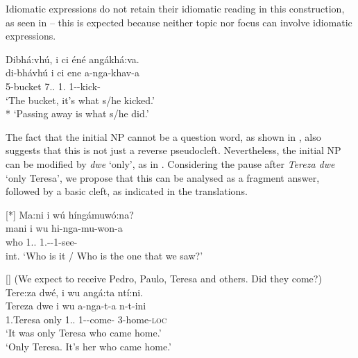 \documentclass[output=paper]{langscibook}
\begin{document}

\z

Idiomatic expressions do not retain their idiomatic reading in this construction, as seen in  – this is expected because neither topic nor focus can involve idiomatic expressions.\largerpage

\ea
\label{bkm:Ref127264997}
Dibhá:vhú, i ci éné angákhá:va.\\
\gll
di-bhávhú  i  ci  ene  a-nga-khav-a\\
5-bucket  \COP{}  7.\DEM.\PROX{}  1.\PRO{}  1\SM-\REL{}-kick-\FV{}\\
\glt
‘The bucket, it’s what s/he kicked.’\\
* `Passing away is what s/he did.’

\z

The fact that the initial NP cannot be a question word, as shown in , also suggests that this is not just a reverse pseudocleft. Nevertheless, the initial NP can be modified by \textit{dwe} ‘only’, as in . Considering the pause after \textit{Tereza dwe} ‘only Teresa’, we propose that this can be analysed as a fragment answer, followed by a basic cleft, as indicated in the translations.

\ea
[*]{
\label{bkm:Ref120698646}
Ma:ni i wú híngámuwó:na?\\
\gll
mani  i  wu  hi-nga-mu-won-a\\
who  \COP{}  1.\DEM.\PROX{}  1\SM.\PL{}-\REL{}-1\OM{}-see-\FV{}\\
\glt
int. ‘Who is it / Who is the one that we saw?’\\
}

\ex
[]{
\label{bkm:Ref120698660}
(We expect to receive Pedro, Paulo, Teresa and others. Did they come?)\\
Tere:za dwé, i wu angá:ta ntí:ni.\\
\gll
Tereza  dwe  i  wu  a-nga-t-a  n-t-ini\\
1.Teresa  only  \COP{}  1.\DEM.\PROX{}  1\SM-\REL{}-come-\FV{}  3\textsc{-}home\textsc{{}-loc}\\
\glt
‘It was only Teresa who came home.’\\
‘Only Teresa. It’s her who came home.’
}
\end{document}
